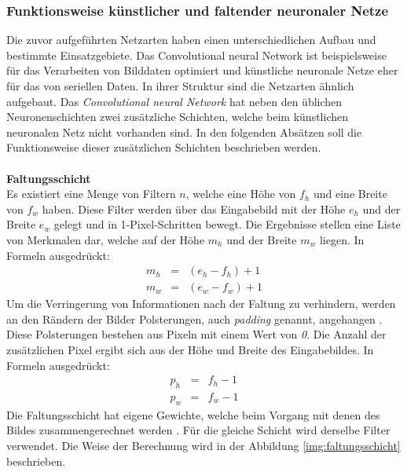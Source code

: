  \subsubsection{Funktionsweise künstlicher und faltender neuronaler Netze}\label{s.funktwknnundcnn}
Die zuvor aufgeführten Netzarten haben einen unterschiedlichen Aufbau und bestimmte Einsatzgebiete. Das Convolutional neural Network ist beispielsweise für das Verarbeiten von Bilddaten optimiert und künstliche neuronale Netze eher für das von seriellen Daten. In ihrer Struktur sind die Netzarten ähnlich aufgebaut. Das \textit{Convolutional neural Network} hat neben den üblichen Neuronenschichten zwei zusätzliche Schichten, welche beim künstlichen neuronalen Netz nicht vorhanden sind. In den folgenden Absätzen soll die Funktionsweise dieser zusätzlichen Schichten beschrieben werden\cite[343]{goodfellow2016deep}.\\\\
\textbf{Faltungsschicht}\\
Es existiert eine Menge von Filtern $n$, welche eine Höhe von $f_{h}$ und eine Breite von $f_{w}$ haben. Diese Filter werden über das Eingabebild mit der Höhe $e_{h}$ und der Breite $e_{w}$ gelegt und in 1-Pixel-Schritten bewegt. Die Ergebnisse stellen eine Liste von Merkmalen dar, welche auf der Höhe $m_{h}$ und der Breite $m_{w}$ liegen. In Formeln ausgedrückt:
\begin{eqnarray} 
m_{h}&=&(e_{h} - f_{h})+1\\
m_{w}&=&(e_{w} - f_{w})+1
\end{eqnarray}
Um die Verringerung von Informationen nach der Faltung zu verhindern, werden an den Rändern der Bilder Polsterungen, auch \textit{padding} genannt, angehangen \cite[343]{goodfellow2016deep}. Diese Polsterungen bestehen aus Pixeln mit einem Wert von \textit{0}. Die Anzahl der zusätzlichen Pixel ergibt sich aus der Höhe und Breite des Eingabebildes. In Formeln ausgedrückt:
\begin{eqnarray}
p_{h}&=&f_{h} - 1\\
p_{w}&=&f_{w} - 1
\end{eqnarray}
Die Faltungsschicht hat eigene Gewichte, welche beim Vorgang mit denen des Bildes zusammengerechnet werden \cite[331ff.]{goodfellow2016deep}. Für die gleiche Schicht wird derselbe Filter verwendet. Die Weise der Berechnung wird in der Abbildung \ref{img:faltungsschicht}  beschrieben.
